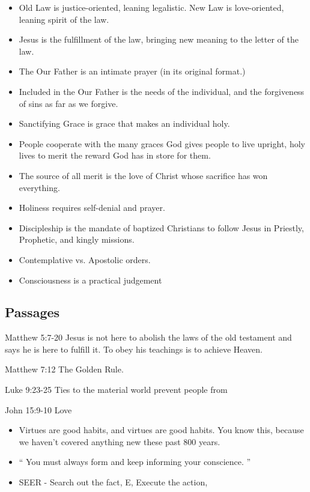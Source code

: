 \documentclass[11pt]{article}
\begin{document}
\begin{itemize}
	\item Old Law is justice-oriented, leaning legalistic.  New Law 
		is love-oriented,	leaning spirit of the law.
	\item Jesus is the fulfillment of the law, bringing new meaning 
		to the letter	of the law.
	\item The Our Father is an intimate prayer (in its original 
		format.)
	\item Included in the Our Father is the needs of the individual,
		and	the forgiveness of sins as far as we forgive.
	\item Sanctifying Grace is grace that makes an individual holy.
	\item People cooperate with the many graces God gives people 
		to live upright, holy lives to merit the reward God has in 
		store	for them.
	\item The source of all merit is the love of Christ whose 
		sacrifice has won everything.
	\item Holiness requires self-denial and prayer.
	\item Discipleship is the mandate of baptized Christians to 
		follow Jesus in Priestly, Prophetic, and kingly missions.
	\item Contemplative vs. Apostolic orders.
	\item Consciousness is a practical judgement
\end{itemize}
\subsection{Passages}
Matthew 5:7-20 
	Jesus is not here to abolish the laws of the old 
	testament	and says he is here to fulfill it.  To obey his
	teachings is to achieve Heaven.

Matthew 7:12
	The Golden Rule.

Luke 9:23-25
	Ties to the material world prevent people from 

John 15:9-10
	Love

\begin{itemize}
	\item Virtues are good habits, and virtues are
		good habits.  You know this, because we haven't
		covered anything new these past 800 years.
	\item `` You must always form and keep informing
		your conscience. ''
	\item SEER - Search out the fact, E, Execute the
		action, 
\end{itemize}
\end{document}
